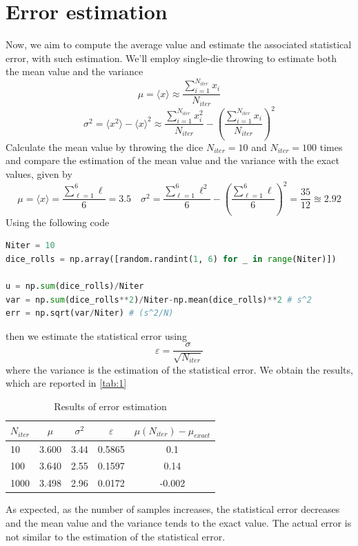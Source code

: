 \documentclass{article}
\begin{document}
\section{Error estimation}
Now, we aim to compute the average value and estimate the associated statistical error, with such estimation. We'll employ single-die throwing to estimate both the mean value and the variance
\begin{equation}
    \mu=\langle x\rangle\approx\frac{\sum_{i=1}^{N_{iter}}{x_i}}{N_{iter}}
\end{equation}
\begin{equation}
    \sigma^2=\langle x^2\rangle-\langle x \rangle^2\approx\frac{\sum_{i=1}^{N_{iter}}{x_i^2}}{N_{iter}}-\left(\frac{\sum_{i=1}^{N_{iter}}{x_i}}{N_{iter}}\right)^2
\end{equation}
Calculate the mean value by throwing the dice $N_{iter}=10$ and $N_{iter}=100$ times and compare the estimation of the mean value and the variance with the exact values, given by
\begin{equation*}
    \mu=\langle x\rangle=\frac{\sum_{\ell=1}^{6}{\ell}}{6}=3.5\quad \sigma^2=\frac{\sum_{\ell=1}^{6}{\ell^2}}{6}-\left(\frac{\sum_{\ell=1}^{6}{\ell}}{6}\right)^2=\frac{35}{12}\approxeq2.92
\end{equation*}
Using the following code
\begin{lstlisting}[language=Python]
Niter = 10
dice_rolls = np.array([random.randint(1, 6) for _ in range(Niter)])

u = np.sum(dice_rolls)/Niter
var = np.sum(dice_rolls**2)/Niter-np.mean(dice_rolls)**2 # s^2
err = np.sqrt(var/Niter) # (s^2/N)
\end{lstlisting}
then we estimate the statistical error using
\begin{equation}
    \varepsilon=\frac\sigma{\sqrt{N_{iter}}}
\end{equation}
where the variance is the estimation of the statistical error. We obtain the results, which are reported in \autoref{tab:1}
\begin{table}[H]
    \centering
    \begin{tabular}{|l|c|c|c|c|}
        \hline $N_{iter}$  & $\mu$ & $\sigma^2$ &  $\varepsilon $ & $\mu(N_{iter})-\mu_{exact}$\\\hline\hline
        10 & 3.600 & 3.44 & 0.5865 & 0.1\\\hline
        100 & 3.640 & 2.55 & 0.1597 & 0.14\\\hline
        1000 & 3.498 & 2.96 & 0.0172 & -0.002\\\hline
    \end{tabular}
    \caption{Results of error estimation}
    \label{tab:1}
\end{table}
\noindent As expected, as the number of samples increases, the statistical error decreases and the mean value and the variance tends to the exact value. The actual error is not similar to the estimation of the statistical error.
\end{document}
